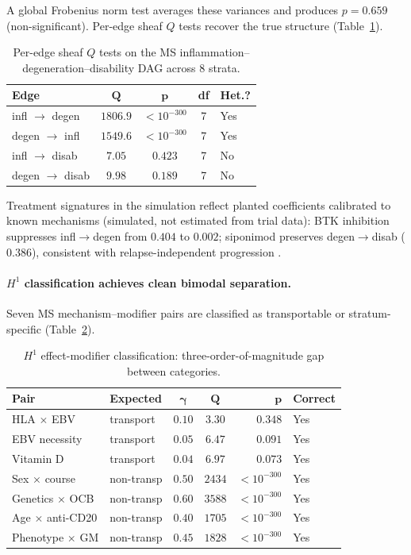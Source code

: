 \documentclass{article}
\begin{document}
A global Frobenius norm test averages these variances and produces $p = 0.659$ (non-significant).
Per-edge sheaf $Q$ tests recover the true structure (Table~\ref{tab:dag}).

\begin{table}[t]
\centering
\caption{Per-edge sheaf $Q$ tests on the MS inflammation--degeneration--disability DAG across 8 strata.}
\label{tab:dag}
\small
\begin{tabular}{@{}lcccl@{}}
\toprule
\textbf{Edge} & $\boldsymbol{Q}$ & $\boldsymbol{p}$ & \textbf{df} & \textbf{Het.?} \\
\midrule
infl $\to$ degen & $1806.9$ & $< 10^{-300}$ & 7 & Yes \\
degen $\to$ infl & $1549.6$ & $< 10^{-300}$ & 7 & Yes \\
infl $\to$ disab & $7.05$ & $0.423$ & 7 & No \\
degen $\to$ disab & $9.98$ & $0.189$ & 7 & No \\
\bottomrule
\end{tabular}
\end{table}

Treatment signatures in the simulation reflect planted coefficients calibrated to known mechanisms (simulated, not estimated from trial data): BTK inhibition suppresses infl$\to$degen from $0.404$ to $0.002$; siponimod preserves degen$\to$disab ($0.386$), consistent with relapse-independent progression \citep{kappos2018siponimod}.

\paragraph{$H^1$ classification achieves clean bimodal separation.}
Seven MS mechanism--modifier pairs are classified as transportable or stratum-specific (Table~\ref{tab:h1}).

\begin{table}[t]
\centering
\caption{$H^1$ effect-modifier classification: three-order-of-magnitude gap between categories.}
\label{tab:h1}
\small
\begin{tabular}{@{}llccrl@{}}
\toprule
\textbf{Pair} & \textbf{Expected} & $\boldsymbol{\gamma}$ & $\boldsymbol{Q}$ & $\boldsymbol{p}$ & \textbf{Correct} \\
\midrule
HLA $\times$ EBV & transport & $0.10$ & $3.30$ & $0.348$ & Yes \\
EBV necessity & transport & $0.05$ & $6.47$ & $0.091$ & Yes \\
Vitamin D & transport & $0.04$ & $6.97$ & $0.073$ & Yes \\
\midrule
Sex $\times$ course & non-transp & $0.50$ & $2434$ & $< 10^{-300}$ & Yes \\
Genetics $\times$ OCB & non-transp & $0.60$ & $3588$ & $< 10^{-300}$ & Yes \\
Age $\times$ anti-CD20 & non-transp & $0.40$ & $1705$ & $< 10^{-300}$ & Yes \\
Phenotype $\times$ GM & non-transp & $0.45$ & $1828$ & $< 10^{-300}$ & Yes \\
\bottomrule
\end{tabular}
\end{table}
\end{document}
